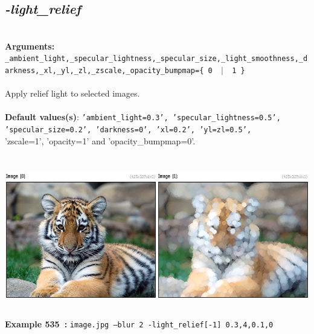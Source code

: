 \documentclass[a4paper,11pt,twoside]{book}
\begin{document}
\subsection{\emph{-light\_relief} }\vspace*{-0.5em}
~\\\textbf{Arguments: } 
{\small \texttt{\_ambient\_light,\_specular\_lightness,\_specular\_size,\_light\_smoothness,\_darkness,\_xl,\_yl,\_zl,\_zscale,\_opacity\_bumpmap=\{ 0 ~$|$~ 1 \}}}\\~\\
Apply relief light to selected images.
~\\~\\\textbf{Default values(s)}: {\small \texttt{'ambient\_light=0.3', 'specular\_lightness=0.5', 'specular\_size=0.2', 'darkness=0', 'xl=0.2', 'yl=zl=0.5',}}
~\\'zscale=1', 'opacity=1' and 'opacity\_bumpmap=0'.
\begin{center}\includegraphics[keepaspectratio=true,height=7cm,width=\textwidth]{img/gmic_def535.jpg}\\
{\footnotesize \textbf{Example 535~:} \texttt{image.jpg --blur 2 -light\_relief[-1] 0.3,4,0.1,0}}
\end{center}
\end{document}
